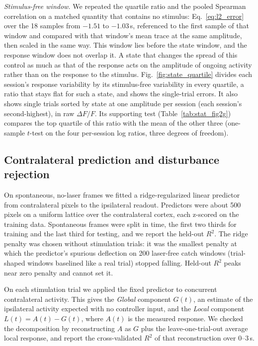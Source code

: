 \emph{Stimulus-free window.} We repeated the quartile ratio and the pooled Spearman correlation on a matched quantity that contains no stimulus: Eq.~\eqref{eq:l2_error} over the 18 samples from $-1.51$ to $-1.03$\,s, referenced to the first sample of that window and compared with that window's mean trace at the same amplitude, then scaled in the same way.
This window lies before the state window, and the response window does not overlap it.
A state that changes the spread of this control as much as that of the response acts on the amplitude of ongoing activity rather than on the response to the stimulus.
Fig.~\ref{fig:state_quartile} divides each session's response variability by its stimulus-free variability in every quartile, a ratio that stays flat for such a state, and shows the single-trial errors.
It also shows single trials sorted by state at one amplitude per session (each session's second-highest), in raw $\Delta F/F$.
Its supporting test (Table~\ref{tab:stat_fig2g}) compares the top quartile of this ratio with the mean of the other three (one-sample $t$-test on the four per-session log ratios, three degrees of freedom).

\subsection*{Contralateral prediction and disturbance rejection}
\label{sec:disturbance_decomp}

On spontaneous, no-laser frames we fitted a ridge-regularized linear predictor from contralateral pixels to the ipsilateral readout.
Predictors were about 500 pixels on a uniform lattice over the contralateral cortex, each z-scored on the training data.
Spontaneous frames were split in time, the first two thirds for training and the last third for testing, and we report the held-out $R^{2}$.
The ridge penalty was chosen without stimulation trials: it was the smallest penalty at which the predictor's spurious deflection on 200 laser-free catch windows (trial-shaped windows baselined like a real trial) stopped falling.
Held-out $R^2$ peaks near zero penalty and cannot set it.

On each stimulation trial we applied the fixed predictor to concurrent contralateral activity.
This gives the \emph{Global} component $G(t)$, an estimate of the ipsilateral activity expected with no controller input, and the \emph{Local} component $L(t) = A(t) - G(t)$, where $A(t)$ is the measured response.
We checked the decomposition by reconstructing $A$ as $G$ plus the leave-one-trial-out average local response, and report the cross-validated $R^{2}$ of that reconstruction over 0--3\,s.

